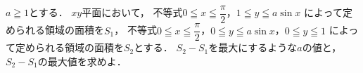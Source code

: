 \documentclass[../../main.tex]{subfiles}
\begin{document}
$a\geqq1$とする．
$xy$平面において，
不等式$\displaystyle 0 \leqq x \leqq \dfrac{\pi}{2}$，$1 \leqq y \leqq a\sin x$
によって定められる領域の面積を$S_1$，
不等式$\displaystyle 0 \leqq x \leqq \dfrac{\pi}{2}$，$0 \leqq y \leqq a\sin x$，$0 \leqq y \leqq 1$
によって定められる領域の面積を$S_2$とする．
$S_2-S_1$を最大にするような$a$の値と，$S_2-S_1$の最大値を求めよ．
\end{document}
